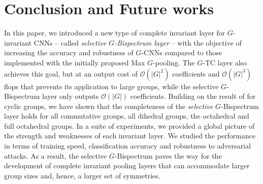 \documentclass{article}
\theoremstyle{plain}
\theoremstyle{definition}
\theoremstyle{remark}
\begin{document}
\section{Conclusion and Future works}
In this paper, we introduced a new type of complete invariant layer for $G$-invariant CNNs -- called \emph{selective $G$-Bispectrum layer} -- with the objective of increasing the accuracy and robustness of $G$-CNNs compared to those implemented with the initially proposed Max $G$-pooling. The $G$-TC layer also achieves this goal, but at an output cost of $\mathcal{O}(|G|^2)$ coefficients and $\mathcal{O}(|G|^3)$ flops that prevents its application to large groups, while the selective $G$-Bispectrum layer only outputs $\mathcal{O}(|G|)$ coefficients. Building on the result of \citet{kakarala_thesis} for cyclic groups, we have shown that the completeness of the \textit{selective} $G$-Bispectrum layer holds for all commutative groups, all dihedral groups, the octahedral and full octahedral groups. In a suite of experiments, we provided a global picture of the strength and weaknesses of each invariant layer. We studied the performance in terms of training speed, classification accuracy and robustness to adversarial attacks. As a result, the selective $G$-Bispectrum paves the way for the development of complete invariant pooling layers that can accommodate larger group sizes and, hence, a larger set of symmetries.
\newpage


\end{document}
